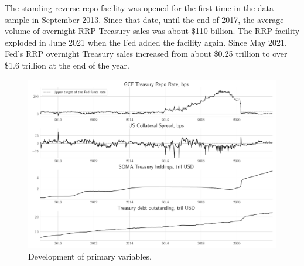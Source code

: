 \documentclass[11pt,a4paper,english,oneside]{article}
\begin{document}
The standing reverse-repo facility was opened for the first time in the data sample in September 2013. Since that date, until the end of 2017, the average volume of overnight RRP Treasury sales was about \$110 billion. The RRP facility exploded in June 2021 when the Fed added the facility again. Since May 2021, Fed's RRP overnight Treasury sales increased from about \$0.25 trillion to over \$1.6 trillion at the end of the year.

\begin{figure}[htb!]
  \begin{center}
    \caption{Development of primary variables.}
    \includegraphics[width=0.99\linewidth]{main_vars.pdf}
  \end{center}
  \label{fig:vars}
\end{figure}

\end{document}
